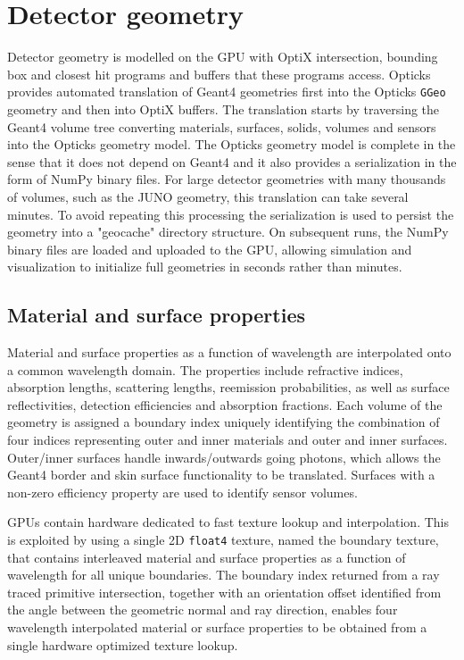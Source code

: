 \documentclass{webofc}
\begin{document}
\section{Detector geometry} 
%
%
Detector geometry is modelled on the GPU with OptiX intersection, bounding box 
and closest hit programs and buffers that these programs access.
Opticks provides automated translation of Geant4 geometries first into the Opticks {\tt GGeo} geometry and then into OptiX buffers.
The translation starts 
by traversing the Geant4 volume tree converting materials, surfaces, solids, volumes and sensors 
into the Opticks geometry model.  The Opticks geometry model is complete 
in the sense that it does not depend on Geant4 and it also provides a serialization in the 
form of NumPy\cite{numpy} binary files. 
%
For large detector geometries with many thousands of volumes, such as the JUNO geometry, 
this translation can take several minutes. To avoid repeating this processing the serialization 
is used to persist the geometry into a "geocache" directory structure.
On subsequent runs, the NumPy binary files are loaded and uploaded to the GPU, allowing simulation and 
visualization to initialize full geometries in seconds rather than minutes.
%
\subsection{Material and surface properties} 

Material and surface properties as a function of wavelength are interpolated onto a common wavelength domain.
The properties include refractive indices, absorption lengths, scattering lengths, reemission probabilities, 
as well as surface reflectivities, detection efficiencies and absorption fractions. 
Each volume of the geometry is assigned a boundary index uniquely identifying the combination of four indices representing 
outer and inner materials and outer and inner surfaces. Outer/inner surfaces handle inwards/outwards going photons, which allows the Geant4 border and skin
surface functionality to be translated. Surfaces with a non-zero efficiency property are used to identify sensor volumes. 

GPUs contain hardware dedicated to fast texture lookup and interpolation.
This is exploited by using a single 2D {\tt float4} texture, named the boundary texture,
that contains interleaved material and surface properties as a function of wavelength for all
unique boundaries.
The boundary index returned from a ray traced primitive intersection, together with
an orientation offset identified from the angle between the geometric normal and ray direction,
enables four wavelength interpolated material or surface properties to be
obtained from a single hardware optimized texture lookup.
\end{document}
